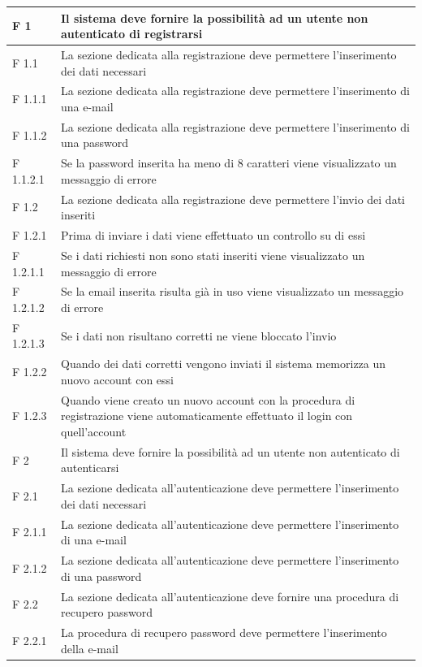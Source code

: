 \documentclass[a4paper,11pt]{article}
\begin{document}
\begin{longtable}{p{}p{}}
F 1 & Il sistema deve fornire la possibilità ad un utente non autenticato di registrarsi\\
\midrule
F 1.1 & La sezione dedicata alla registrazione deve permettere l'inserimento dei dati necessari\\
\midrule
F 1.1.1 & La sezione dedicata alla registrazione deve permettere l'inserimento di una e-mail\\
\midrule
F 1.1.2 & La sezione dedicata alla registrazione deve permettere l'inserimento di una password\\
\midrule
F 1.1.2.1 & Se la password inserita ha meno di 8 caratteri viene visualizzato un messaggio di errore\\
\midrule
F 1.2 & La sezione dedicata alla registrazione deve permettere l'invio dei dati inseriti\\
\midrule
F 1.2.1 & Prima di inviare i dati viene effettuato un controllo su di essi\\
\midrule
F 1.2.1.1 & Se i dati richiesti non sono stati inseriti viene visualizzato un messaggio di errore\\
\midrule
F 1.2.1.2 & Se la email inserita risulta già in uso viene visualizzato un messaggio di errore\\
\midrule
F 1.2.1.3 & Se i dati non risultano corretti ne viene bloccato l'invio\\
\midrule
F 1.2.2 & Quando dei dati corretti vengono inviati il sistema memorizza un nuovo account con essi\\
\midrule
F 1.2.3 & Quando viene creato un nuovo account con la procedura di registrazione viene automaticamente effettuato il login con quell'account\\
\midrule
F 2 & Il sistema deve fornire la possibilità ad un utente non autenticato di autenticarsi\\
\midrule
F 2.1 & La sezione dedicata all'autenticazione deve permettere l'inserimento dei dati necessari\\
\midrule
F 2.1.1 & La sezione dedicata all'autenticazione deve permettere l'inserimento di una e-mail\\
\midrule
F 2.1.2 & La sezione dedicata all'autenticazione deve permettere l'inserimento di una password\\
\midrule
F 2.2 & La sezione dedicata all'autenticazione deve fornire una procedura di recupero password\\
\midrule
F 2.2.1 & La procedura di recupero password deve permettere l'inserimento della e-mail\\

\end{longtable}
\end{document}
